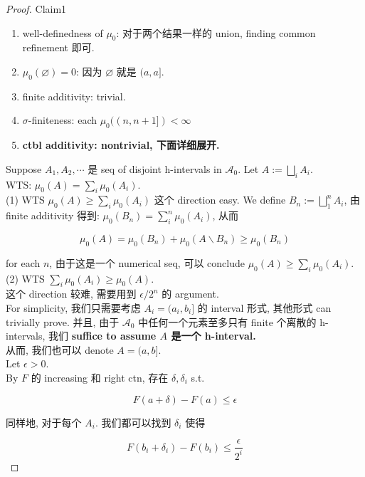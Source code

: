 \documentclass{qlnotes-export}
\begin{document}
\begin{proof}

Claim1

\begin{enumerate}
\item
  well-definedness of \(\mu_{0}\): 对于两个结果一样的 union, finding common refinement 即可.
\item
  \(\mu_{0}(\varnothing) = 0\): 因为 \(\varnothing\) 就是 \((a,a\rbrack\).
\item
  finite additivity: trivial.
\item
  \(\sigma\)-finiteness: each \(\mu_{0}((n,n + 1\rbrack) < \infty\)
\item
  \textbf{ctbl additivity: nontrivial, 下面详细展开.}
\end{enumerate}

Suppose \(A_{1},A_{2},\cdots\) 是 seq of disjoint h-intervals in \(\mathcal{A}_{0}\). Let \(A := \bigsqcup_{i}A_{i}\).\\
WTS: \(\mu_{0}(A) = \sum_{i}\mu_{0}(A_{i})\).\\
(1) WTS \(\mu_{0}(A) \geq \sum_{i}\mu_{0}(A_{i})\) 这个 direction easy. We define \(B_{n} := \bigsqcup_{1}^{n}A_{i}\), 由 finite additivity 得到: \(\mu_{0}(B_{n}) = \sum_{i}^{n}\mu_{0}(A_{i})\), 从而

\[\mu_{0}(A) = \mu_{0}(B_{n}) + \mu_{0}(A\backslash B_{n}) \geq \mu_{0}(B_{n})\]

for each \(n\), 由于这是一个 numerical seq, 可以 conclude \(\mu_{0}(A) \geq \sum_{i}\mu_{0}(A_{i})\). (2) WTS \(\sum_{i}\mu_{0}(A_{i}) \geq \mu_{0}(A)\).\\
这个 direction 较难, 需要用到 \(\epsilon/2^{n}\) 的 argument.\\
For simplicity, 我们只需要考虑 \(A_{i} = (a_{i},b_{i}\rbrack\) 的 interval 形式, 其他形式 can trivially prove. 并且, 由于 \(\mathcal{A}_{0}\) 中任何一个元素至多只有 finite 个离散的 h-intervals, 我们 \textbf{suffice to assume \(A\) 是一个 h-interval.}\\
从而, 我们也可以 denote \(A = (a,b\rbrack\).\\
Let \(\epsilon > 0\).\\
By \(F\) 的 increasing 和 right ctn, 存在 \(\delta,\delta_{i}\) s.t.

\[F(a + \delta) - F(a) \leq \epsilon\]

同样地, 对于每个 \(A_{i}\). 我们都可以找到 \(\delta_{i}\) 使得

\[F(b_{i} + \delta_{i}) - F(b_{i}) \leq \frac{\epsilon}{2^{i}}\]


\end{proof}
\end{document}
